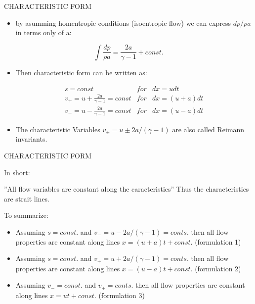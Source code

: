 \documentclass{beamer}
\begin{document}
\begin{frame}{CHARACTERISTIC FORM}
  \begin{itemize}
   \item by asumming homentropic conditions (isoentropic flow) we can express $dp/\rho{a}$ in terms only of a:
  \end{itemize}
  \begin{equation}
    \int\frac{dp}{\rho{a}}=\frac{2a}{\gamma-1}+const.
  \end{equation}
  \begin{itemize}
   \item Then characteristic form can be written as:
  \end{itemize}
  \begin{equation}
    \begin{matrix}
    &&s=const & for & dx=udt\\ 
    &&v_+=u+\frac{2a}{\gamma-1}=const & for & dx=(u+a)dt\\ 
    &&v_-=u-\frac{2a}{\gamma-1}=const & for & dx=(u-a)dt
    \end{matrix}
  \end{equation}
  \begin{itemize}
   \item 
    The characteristic Variables $v_\pm=u\pm {2a}/(\gamma-1)$ are also called Reimann invariants.
  \end{itemize}
\end{frame}

\begin{frame}{CHARACTERISTIC FORM}

In short:

''All flow variables are constant along the caracteristics''
Thus the characteristics are strait lines.

To summarize:
  \begin{itemize}
   \item 
    Assuming $s=const.$ and $v_-=u-2a/(\gamma-1)=conts.$ then all flow properties are constant along lines $x=(u+a)t+const.$ (formulation 1)
   \item 
    Assuming $s=const.$ and $v_+=u+2a/(\gamma-1)=conts.$ then all flow properties are constant along lines $x=(u-a)t+const.$ (formulation 2)
   \item 
    Assuming $v_-=const.$ and $v_+=conts.$ then all flow properties are constant along lines $x=ut+const.$ (formulation 3)
  \end{itemize}
\end{frame}
\end{document}
